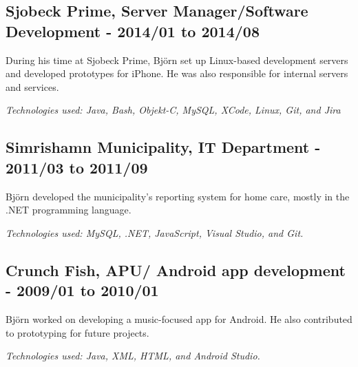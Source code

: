 \newpage
\begin{minipage}[t]{0.7\textwidth}
\subsection*{\textcolor{colorTitelErfarenhet}{Sjobeck Prime, Server Manager/Software Development - 2014/01 to 2014/08}}
During his time at Sjobeck Prime, Björn set up Linux-based development servers and developed prototypes for iPhone. He was also responsible for internal servers and services.

\vspace{5pt}\textit{Technologies used: Java, Bash, Objekt-C, MySQL, XCode, Linux, Git, and Jira} 

\vspace{15pt} %
\subsection*{\textcolor{colorTitelErfarenhet}{Simrishamn Municipality, IT Department - 2011/03 to 2011/09}}
Björn developed the municipality's reporting system for home care, mostly in the .NET programming language.

\vspace{5pt}\textit{Technologies used: MySQL, .NET, JavaScript, Visual Studio, and Git.}


\vspace{15pt} %
\subsection*{\textcolor{colorTitelErfarenhet}{Crunch Fish, APU/ Android app development - 2009/01 to 2010/01}}
Björn worked on developing a music-focused app for Android. He also contributed to prototyping for future projects.

\vspace{5pt}\textit{Technologies used: Java, XML, HTML, and Android Studio.}
\end{minipage}%